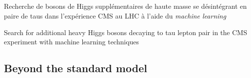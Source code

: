 \subsection*{}
\begin{frame}
\begin{center}
\Large

Recherche de bosons de Higgs supplémentaires de haute masse se désintégrant en paire de taus dans l'expérience CMS au LHC à l'aide du \emph{machine learning}

\vfill

Search for additional heavy Higgs bosons decaying to tau lepton pair in the CMS experiment with machine learning techniques
\end{center}
\end{frame}

\subsection*{Beyond the standard model}
